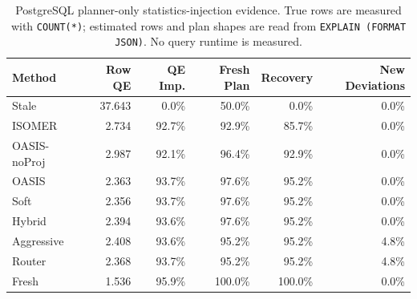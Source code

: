 \begin{table}[t]
  \centering
  \small
  \caption{PostgreSQL planner-only statistics-injection evidence. True rows are measured with \texttt{COUNT(*)}; estimated rows and plan shapes are read from \texttt{EXPLAIN (FORMAT JSON)}. No query runtime is measured.}
  \label{tab:postgres_planner_stats_injection}
  \setlength{\tabcolsep}{4pt}
  \begin{tabular}{lrrrrr}
    \toprule
    Method & Row QE & QE Imp. & Fresh Plan & Recovery & New Deviations \\
    \midrule
    Stale & 37.643 & 0.0\% & 50.0\% & 0.0\% & 0.0\% \\
    ISOMER & 2.734 & 92.7\% & 92.9\% & 85.7\% & 0.0\% \\
    OASIS-noProj & 2.987 & 92.1\% & 96.4\% & 92.9\% & 0.0\% \\
    OASIS & 2.363 & 93.7\% & 97.6\% & 95.2\% & 0.0\% \\
    Soft & 2.356 & 93.7\% & 97.6\% & 95.2\% & 0.0\% \\
    Hybrid & 2.394 & 93.6\% & 97.6\% & 95.2\% & 0.0\% \\
    Aggressive & 2.408 & 93.6\% & 95.2\% & 95.2\% & 4.8\% \\
    Router & 2.368 & 93.7\% & 95.2\% & 95.2\% & 4.8\% \\
    Fresh & 1.536 & 95.9\% & 100.0\% & 100.0\% & 0.0\% \\
    \bottomrule
  \end{tabular}
\end{table}
